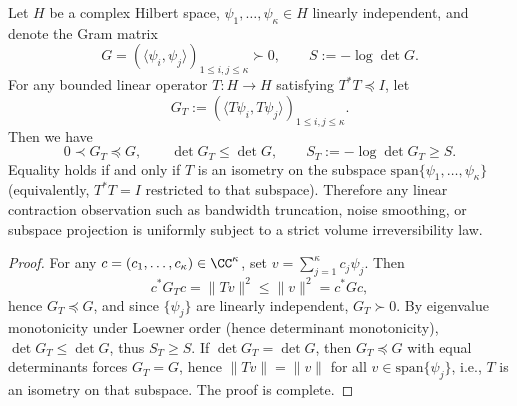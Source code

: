 \begin{proposition}\label{prop:xi-gram-det-entropy-monotone-under-contraction}
Let \(H\) be a complex Hilbert space, \(\psi_1,\dots,\psi_\kappa\in H\) linearly independent, and denote the Gram matrix
\[
G=(\langle\psi_i,\psi_j\rangle)_{1\le i,j\le\kappa}\succ0,
\qquad
S:=-\log\det G.
\]
For any bounded linear operator \(T:H\to H\) satisfying \(T^\ast T\preceq I\), let
\[
G_T:=(\langle T\psi_i,T\psi_j\rangle)_{1\le i,j\le\kappa}.
\]
Then we have
\[
\boxed{\;
0\prec G_T\preceq G,\qquad
\det G_T\le \det G,\qquad
S_T:=-\log\det G_T\ge S.\;}
\]
Equality holds if and only if \(T\) is an isometry on the subspace \(\mathrm{span}\{\psi_1,\dots,\psi_\kappa\}\) (equivalently, \(T^\ast T=I\) restricted to that subspace).
Therefore any linear contraction observation such as bandwidth truncation, noise smoothing, or subspace projection is uniformly subject to a strict volume irreversibility law.
\end{proposition}
\begin{proof}
For any \(c=(c_1,\dots,c_\kappa)\in\CC^\kappa\), set \(v=\sum_{j=1}^\kappa c_j\psi_j\).
Then
\[
c^\ast G_T c=\|Tv\|^2\le \|v\|^2=c^\ast G c,
\]
hence \(G_T\preceq G\), and since \(\{\psi_j\}\) are linearly independent, \(G_T\succ0\).
By eigenvalue monotonicity under Loewner order (hence determinant monotonicity), \(\det G_T\le \det G\), thus \(S_T\ge S\).
If \(\det G_T=\det G\), then \(G_T\preceq G\) with equal determinants forces \(G_T=G\), hence \(\|Tv\|=\|v\|\) for all \(v\in\mathrm{span}\{\psi_j\}\), i.e., \(T\) is an isometry on that subspace. The proof is complete.
\end{proof}

